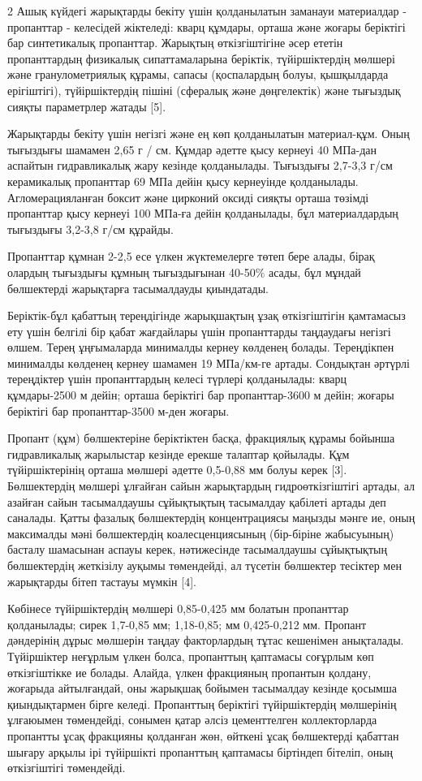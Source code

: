 \begin{multicols}{2}
Ашық күйдегі жарықтарды бекіту үшін қолданылатын заманауи материалдар -
пропанттар - келесідей жіктеледі: кварц құмдары, орташа және жоғары
беріктігі бар синтетикалық пропанттар. Жарықтың өткізгіштігіне әсер
ететін пропанттардың физикалық сипаттамаларына беріктік, түйіршіктердің
мөлшері және гранулометриялық құрамы, сапасы (қоспалардың болуы,
қышқылдарда ерігіштігі), түйіршіктердің пішіні (сфералық және
дөңгелектік) және тығыздық сияқты параметрлер жатады {[}5{]}.

Жарықтарды бекіту үшін негізгі және ең көп қолданылатын материал-құм.
Оның тығыздығы шамамен 2,65 г / см. Құмдар әдетте
қысу кернеуі 40 МПа-дан аспайтын гидравликалық жару кезінде қолданылады.
Тығыздығы 2,7-3,3 г/см керамикалық пропанттар 69 МПа
дейін қысу кернеуінде қолданылады. Агломерацияланған боксит және
цирконий оксиді сияқты орташа төзімді пропанттар қысу кернеуі 100 МПа-ға
дейін қолданылады, бұл материалдардың тығыздығы 3,2-3,8
г/см құрайды.

Пропанттар құмнан 2-2,5 есе үлкен жүктемелерге төтеп бере алады, бірақ
олардың тығыздығы құмның тығыздығынан 40-50\% асады, бұл мұндай
бөлшектерді жарықтарға тасымалдауды қиындатады.

Беріктік-бұл қабаттың тереңдігінде жарықшақтың ұзақ өткізгіштігін
қамтамасыз ету үшін белгілі бір қабат жағдайлары үшін пропанттарды
таңдаудағы негізгі өлшем. Терең ұңғымаларда минималды кернеу көлденең
болады. Тереңдікпен минималды көлденең кернеу шамамен 19 МПа/км-ге
артады. Сондықтан әртүрлі тереңдіктер үшін пропанттардың келесі түрлері
қолданылады: кварц құмдары-2500 м дейін; орташа беріктігі бар
пропанттар-3600 м дейін; жоғары беріктігі бар пропанттар-3500 м-ден
жоғары.

Пропант (құм) бөлшектеріне беріктіктен басқа, фракциялық құрамы бойынша
гидравликалық жарылыстар кезінде ерекше талаптар қойылады. Құм
түйіршіктерінің орташа мөлшері әдетте 0,5-0,88 мм болуы керек {[}3{]}.
Бөлшектердің мөлшері ұлғайған сайын жарықтардың гидроөткізгіштігі
артады, ал азайған сайын тасымалдаушы сұйықтықтың тасымалдау қабілеті
артады деп саналады. Қатты фазалық бөлшектердің концентрациясы маңызды
мәнге ие, оның максималды мәні бөлшектердің коалесценциясының
(бір-біріне жабысуының) басталу шамасынан аспауы керек, нәтижесінде
тасымалдаушы сұйықтықтың бөлшектердің жеткізілу ауқымы төмендейді, ал
түсетін бөлшектер тесіктер мен жарықтарды бітеп тастауы мүмкін {[}4{]}.

Көбінесе түйіршіктердің мөлшері 0,85-0,425 мм болатын пропанттар
қолданылады; сирек 1,7-0,85 мм; 1,18-0,85; мм 0,425-0,212 мм. Пропант
дәндерінің дұрыс мөлшерін таңдау факторлардың тұтас кешенімен
анықталады. Түйіршіктер неғұрлым үлкен болса, пропанттың қаптамасы
соғұрлым көп өткізгіштікке ие болады. Алайда, үлкен фракцияның пропантын
қолдану, жоғарыда айтылғандай, оны жарықшақ бойымен тасымалдау кезінде
қосымша қиындықтармен бірге келеді. Пропанттың беріктігі түйіршіктердің
мөлшерінің ұлғаюымен төмендейді, сонымен қатар әлсіз цементтелген
коллекторларда пропантты ұсақ фракцияны қолданған жөн, өйткені ұсақ
бөлшектерді қабаттан шығару арқылы ірі түйіршікті пропанттың қаптамасы
біртіндеп бітеліп, оның өткізгіштігі төмендейді.


\end{multicols}
